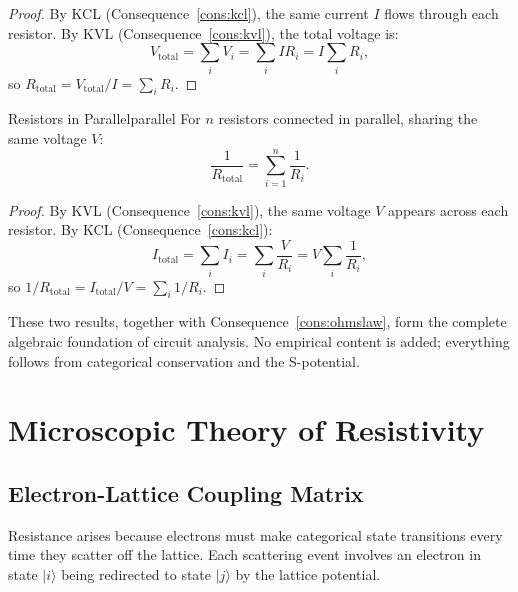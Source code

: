 \begin{proof}
By KCL (Consequence~\ref{cons:kcl}), the same current $I$ flows through
each resistor.  By KVL (Consequence~\ref{cons:kvl}), the total voltage is:
\begin{equation}
  V_{\mathrm{total}} = \sum_i V_i = \sum_i I R_i = I \sum_i R_i,
\end{equation}
so $R_{\mathrm{total}} = V_{\mathrm{total}}/I = \sum_i R_i$.
\end{proof}

\begin{consequence}{Resistors in Parallel}{parallel}
For $n$ resistors connected in parallel, sharing the same voltage $V$:
\begin{equation}
  \frac{1}{R_{\mathrm{total}}} = \sum_{i=1}^n \frac{1}{R_i}.
  \label{eq:ch18-parallel}
\end{equation}
\end{consequence}

\begin{proof}
By KVL (Consequence~\ref{cons:kvl}), the same voltage $V$ appears across
each resistor.  By KCL (Consequence~\ref{cons:kcl}):
\begin{equation}
  I_{\mathrm{total}} = \sum_i I_i = \sum_i \frac{V}{R_i}
    = V\sum_i \frac{1}{R_i},
\end{equation}
so $1/R_{\mathrm{total}} = I_{\mathrm{total}}/V = \sum_i 1/R_i$.
\end{proof}

These two results, together with Consequence~\ref{cons:ohmslaw}, form the
complete algebraic foundation of circuit analysis.  No empirical content is
added; everything follows from categorical conservation and the S-potential.

\section{Microscopic Theory of Resistivity}
\label{sec:ch18-micro}

\subsection{Electron-Lattice Coupling Matrix}

Resistance arises because electrons must make categorical state transitions
every time they scatter off the lattice.  Each scattering event involves an
electron in state $\lvert i \rangle$ being redirected to state
$\lvert j \rangle$ by the lattice potential.

